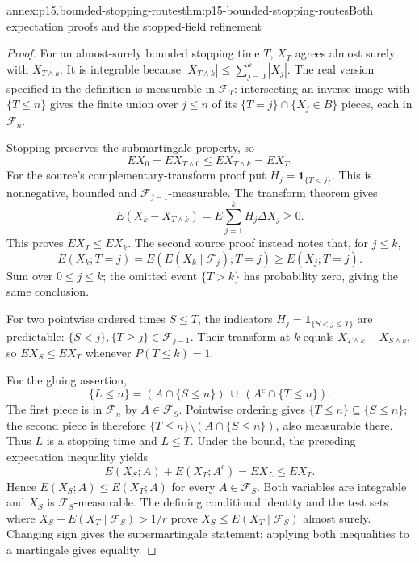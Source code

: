 
\begin{annexitem}{annex:p15.bounded-stopping-routes}{thm:p15-bounded-stopping-routes}{Both expectation proofs and the stopped-field refinement}
\begin{proof}
For an almost-surely bounded stopping time \(T\), \(X_T\) agrees
almost surely with \(X_{T\wedge k}\). It is integrable because
\(|X_{T\wedge k}|\leq\sum_{j=0}^k|X_j|\).
The real version specified in the definition is measurable in
\(\mathcal F_T\): intersecting an inverse image with \(\{T\leq n\}\)
gives the finite union over \(j\leq n\) of its
\(\{T=j\}\cap\{X_j\in B\}\) pieces, each in \(\mathcal F_n\).

Stopping preserves the submartingale property, so
\[
                        EX_0=EX_{T\wedge0}
                                  \leq EX_{T\wedge k}=EX_T.
\]
For the source's complementary-transform proof put
\(H_j=\mathbf1_{\{T<j\}}\). This is nonnegative, bounded and
\(\mathcal F_{j-1}\)-measurable. The transform theorem gives
\[
                 E(X_k-X_{T\wedge k})
                   =E\sum_{j=1}^kH_j\Delta X_j\geq0.
\]
This proves \(EX_T\leq EX_k\).
The second source proof instead notes that, for \(j\leq k\),
\[
          E(X_k;T=j)
             =E(E(X_k\mid\mathcal F_j);T=j)
             \geq E(X_j;T=j).
\]
Sum over \(0\leq j\leq k\); the omitted event \(\{T>k\}\)
has probability zero, giving the same conclusion.

For two pointwise ordered times \(S\leq T\), the indicators
\(H_j=\mathbf1_{\{S<j\leq T\}}\) are predictable:
\(\{S<j\},\{T\geq j\}\in\mathcal F_{j-1}\).
Their transform at \(k\) equals
\(X_{T\wedge k}-X_{S\wedge k}\), so \(EX_S\leq EX_T\)
whenever \(P(T\leq k)=1\).

For the gluing assertion,
\[
 \{L\leq n\}=(A\cap\{S\leq n\})\ \cup\ (A^c\cap\{T\leq n\}).
\]
The first piece is in \(\mathcal F_n\) by \(A\in\mathcal F_S\).
Pointwise ordering gives \(\{T\leq n\}\subseteq\{S\leq n\}\);
the second piece is therefore
\(\{T\leq n\}\setminus(A\cap\{S\leq n\})\), also measurable there.
Thus \(L\) is a stopping time and \(L\leq T\).
Under the bound, the preceding expectation inequality yields
\[
                 E(X_S;A)+E(X_T;A^c)=EX_L\leq EX_T.
\]
Hence \(E(X_S;A)\leq E(X_T;A)\) for every \(A\in\mathcal F_S\).
Both variables are integrable and \(X_S\) is
\(\mathcal F_S\)-measurable. The defining conditional identity and
the test sets where \(X_S-E(X_T\mid\mathcal F_S)>1/r\)
prove \(X_S\leq E(X_T\mid\mathcal F_S)\) almost surely.
Changing sign gives the supermartingale statement; applying both
inequalities to a martingale gives equality.


\end{proof}
\end{annexitem}
